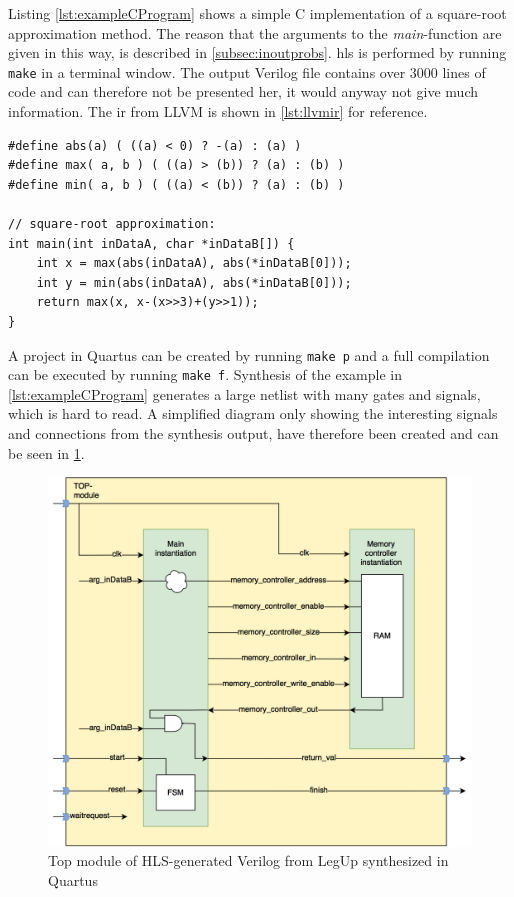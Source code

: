 \noindent
Listing \ref{lst:exampleCProgram} shows a simple C implementation of a square-root approximation method. The reason that the arguments to the \textit{main}-function are given in this way, is described in \cref{subsec:inoutprobs}. \gls{hls} is performed by running \verb!make! in a terminal window. The output Verilog file contains over 3000 lines of code and can therefore not be presented her, it would anyway not give much information. The \gls{ir} from LLVM is shown in \cref{lst:llvmir} for reference.
\lstset{language=C,style=Cstyle}
\begin{lstlisting}[caption={C example: square-root approximation},label=lst:exampleCProgram]
#define abs(a) ( ((a) < 0) ? -(a) : (a) )
#define max( a, b ) ( ((a) > (b)) ? (a) : (b) )
#define min( a, b ) ( ((a) < (b)) ? (a) : (b) )

// square-root approximation:
int main(int inDataA, char *inDataB[]) {
    int x = max(abs(inDataA), abs(*inDataB[0]));
    int y = min(abs(inDataA), abs(*inDataB[0]));
    return max(x, x-(x>>3)+(y>>1));
}
\end{lstlisting}
\noindent
A project in Quartus can be created by running \verb!make p! and a full compilation can be executed by running \verb!make f!. Synthesis of the example in \cref{lst:exampleCProgram} generates a large netlist with many gates and signals, which is hard to read. A simplified diagram only showing the interesting signals and connections from the synthesis output, have therefore been created and can be seen in \cref{fig:legupouttop}.
\begin{figure}[hbpt]
\centering
\includegraphics[width=\textwidth]{../figs/LegUpOutputTop.png}
\caption{\label{fig:legupouttop}Top module of HLS-generated Verilog from LegUp synthesized in Quartus}
\end{figure}
